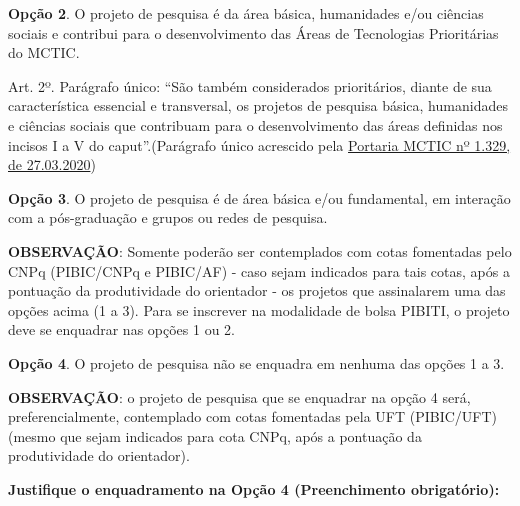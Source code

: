 \documentclass[12pt, 2024, professor]{uftpibic}
\newcommand{\ko}{\makebox[0pt][l]{(\ \ \ )}\raisebox{.15ex}{\hspace{0.1em}$\qquad$}}
\theoremstyle{plain}
\begin{document}
\ko \textbf{Opção 2}. O projeto de pesquisa é da área básica, humanidades e/ou ciências sociais e contribui para o desenvolvimento das Áreas de Tecnologias Prioritárias do MCTIC.


Art. 2º. Parágrafo único: ``São também considerados prioritários, diante de sua característica essencial e transversal, os projetos de pesquisa básica, humanidades e ciências sociais que contribuam para o desenvolvimento das áreas definidas nos incisos I a V do caput''.(Parágrafo único acrescido pela \href{http://www.in.gov.br/en/web/dou/-/portaria-n-1.329-de-27-de-marco-de-2020-250263672}{Portaria MCTIC nº 1.329, de 27.03.2020})

\bigbreak

\ko \textbf{Opção 3}. O projeto de pesquisa é de área básica e/ou fundamental, em interação com a pós-graduação e grupos ou redes de pesquisa.

\bigbreak

\textbf{OBSERVAÇÃO}: Somente poderão ser contemplados com cotas fomentadas pelo CNPq (PIBIC/CNPq e PIBIC/AF) - caso sejam indicados para tais cotas, após a pontuação da produtividade do orientador - os projetos que assinalarem uma das opções acima (1 a 3). Para se inscrever na modalidade de bolsa PIBITI, o projeto deve se enquadrar nas opções 1 ou 2.

\bigbreak

\ko \textbf{Opção 4}. O projeto de pesquisa não se enquadra em nenhuma das opções 1 a 3.

\bigbreak

\textbf{OBSERVAÇÃO}: o projeto de pesquisa que se enquadrar na opção 4 será, preferencialmente, contemplado com cotas fomentadas pela UFT (PIBIC/UFT) (mesmo que sejam indicados para cota CNPq, após a pontuação da produtividade do orientador).
\bigbreak

\textbf{Justifique o enquadramento na Opção 4 (Preenchimento obrigatório):} 

\noindent\makebox[\linewidth]{\rule{\textwidth}{.5pt}}

\noindent\makebox[\linewidth]{\rule{\textwidth}{.5pt}}

\noindent\makebox[\linewidth]{\rule{\textwidth}{.5pt}}

\noindent\makebox[\linewidth]{\rule{\textwidth}{.5pt}}

\noindent\makebox[\linewidth]{\rule{\textwidth}{.5pt}}

\vspace{2cm}
\setlength{\parindent}{1.5cm}
\end{document}
